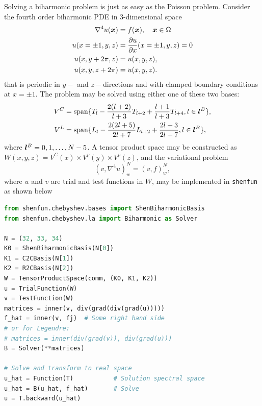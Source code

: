 \documentclass[%
oneside,                 %
final,                   %
10pt]{article}
\begin{document}
Solving a biharmonic problem is just as easy as the Poisson problem. Consider the fourth order biharmonic PDE in 3-dimensional space
\begin{align}
\nabla^4 u(\boldsymbol{x}) &= f(\boldsymbol{x}), \quad \boldsymbol{x} \in \Omega \\
 u(x=\pm1, y, z) &= \frac{\partial u}{\partial x} (x=\pm 1, y, z) = 0 \\
 u(x, y+2\pi, z) &= u(x, y, z), \\
 u(x, y, z+2\pi) &= u(x, y, z). 
\end{align}
that is periodic in $y-$ and $z-$directions and with clamped boundary conditions at $x=\pm 1$. The problem may be solved using either one of these two bases:
\begin{align}
V^C &= \text{span}\{T_l - \frac{2(l+2)}{l+3}T_{l+2} + \frac{l+1}{l+3}T_{l+4} , l \in \boldsymbol{l}^B\}, \label{eq:chebbiharmonic} \\
V^L &= \text{span}\{L_l - \frac{2(2l+5)}{2l+7}L_{l+2} + \frac{2l+3}{2l+7}, l \in \boldsymbol{l}^B\}, \label{eq:legbiharmonic}
\end{align}
where $\boldsymbol{l}^B = 0, 1, \ldots, N-5$. A tensor product space may be constructed as $W(x,y,z) = V^C(x) \times V^p(y) \times V^p(z)$, and the variational problem 
\begin{equation}
(v, \nabla^4 u)^N_w = (v, f)^N_w,
\end{equation}
where $u$ and $v$ are trial and test functions in $W$, may be implemented in \texttt{shenfun} as shown below
\begin{lstlisting}[language=Python,style=yellow2_fb]
from shenfun.chebyshev.bases import ShenBiharmonicBasis
from shenfun.chebyshev.la import Biharmonic as Solver

N = (32, 33, 34)
K0 = ShenBiharmonicBasis(N[0])
K1 = C2CBasis(N[1])
K2 = R2CBasis(N[2])
W = TensorProductSpace(comm, (K0, K1, K2))
u = TrialFunction(W)
v = TestFunction(W)
matrices = inner(v, div(grad(div(grad(u)))))
f_hat = inner(v, fj)  # Some right hand side
# or for Legendre:
# matrices = inner(div(grad(v)), div(grad(u)))
B = Solver(**matrices)

# Solve and transform to real space
u_hat = Function(T)           # Solution spectral space
u_hat = B(u_hat, f_hat)       # Solve
u = T.backward(u_hat)
\end{lstlisting}

\end{document}
